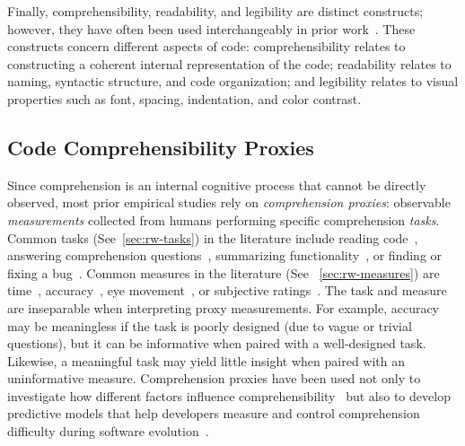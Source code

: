 Finally, comprehensibility, readability, and legibility are distinct constructs; however, they have often been used interchangeably in prior work~\cite{Wyrich:ACS23}. These constructs concern different aspects of code: comprehensibility relates to constructing a coherent internal representation of the code; readability relates to naming, syntactic structure, and code organization; and legibility relates to visual properties such as font, spacing, indentation, and color contrast.

\subsection{Code Comprehensibility Proxies}
Since comprehension is an internal cognitive process that cannot be directly observed, most prior empirical studies rely on \emph{comprehension proxies}:
observable \textit{measurements} collected from humans performing specific comprehension \textit{tasks}. Common tasks (See~\ref{sec:rw-tasks}) in the literature include reading code~\cite{Karas:TSE2024}, answering comprehension questions~\cite{Park:ESE24, Peitek:ICPC20, Abdelsalam:ESE2026, Gao:EASE2025}, summarizing functionality~\cite{Karas:TSE2024,Peitek:ICPC20, Flint:2026}, or finding or fixing a bug~\cite{Nielebock:ESE2019, Flint:2026}.
Common measures in the literature  (See ~\ref{sec:rw-measures}) are time~\cite{Nielebock:ESE2019, Peitek:ICPC20, Peitek:ICSE2021, Karas:TSE2024, Park:ESE24, Alakmeh:ASE2024, Elfares:2025, Abdelsalam:ESE2026}, accuracy~\cite{Nielebock:ESE2019, Peitek:ICPC20, Peitek:ICSE2021, Ribeiro:ESE23, Karas:TSE2024, Park:ESE24, Alakmeh:ASE2024, Elfares:2025, Flint:2026, Abdelsalam:ESE2026}, eye movement~\cite{Peitek:ICPC20, Abbad-Andaloussi:ICPC22, Park:ESE24, Elfares:2025, Abdelsalam:ESE2026, Flint:2026}, or subjective ratings~\cite{Peitek:ICSE2021, Ribeiro:ESE23, Alakmeh:ASE2024, Elfares:2025, Bergum:TOSEM2026, Abdelsalam:ESE2026}.
The task and measure are inseparable when interpreting proxy measurements. For example, accuracy may be meaningless if the task is poorly designed (\eg due to vague or trivial questions),
but it can be informative when paired with a well-designed task. Likewise, a meaningful task may yield little insight when paired with an uninformative measure.
Comprehension proxies have been used not only to investigate how different factors influence comprehensibility~\cite{S4,S49,Peitek:TSE18,Siegmund:ICSE14,Stapleton:ICPC2020,Wyrich:ACS23} but also to develop predictive models that help developers measure and control comprehension difficulty during software evolution~\cite{Scalabrino:TSE19,Raymond:TSE10,Lavazza:ESE2023, De:2025}.

